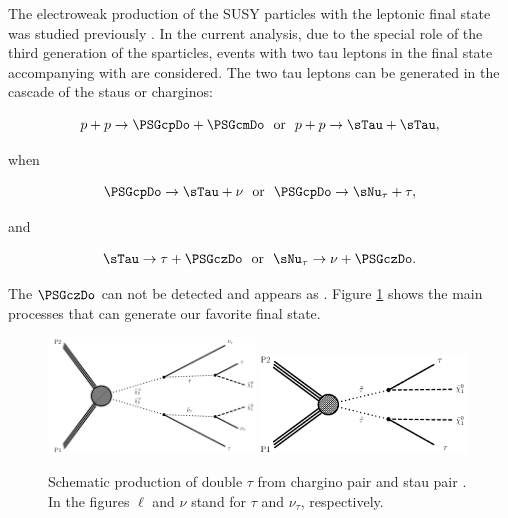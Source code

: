 The electroweak production of the SUSY particles with the leptonic final state was studied previously \cite{Khachatryan:2014qwa}.
In the current analysis, due to the special role of the third generation of the sparticles, events with two tau leptons in the final state 
accompanying with \MPT are considered.
The two tau leptons can be generated in the cascade of the staus or charginos:
\begin{linenomath}
\begin{equation}
p + p \rightarrow \PSGcpDo +\PSGcmDo ~~\mathrm{or}~~  p + p \rightarrow \sTau + \sTau,
\end{equation}
\end{linenomath}
when 
\begin{linenomath}
\begin{equation}
\PSGcpDo \rightarrow \sTau + \nu ~~\mathrm{or}~~  \PSGcpDo \rightarrow \sNu_{\tau} + \tau,
\end{equation}
\end{linenomath}
and 
\begin{linenomath}
\begin{equation}
\sTau \rightarrow \tau + \PSGczDo ~~\mathrm{or}~~  \sNu_{\tau} \rightarrow \nu + \PSGczDo.
\end{equation}
\end{linenomath}
The $\PSGczDo$ can not be detected and appears as \MPT.
Figure \ref{fig:Productions} shows the main processes that can generate our favorite final state.
\begin{figure}[!Hhtb]
\centering
\includegraphics[width=0.49\textwidth]{Introductionfigs/TChipmSlepSnu.pdf}
\includegraphics[width=0.49\textwidth]{Introductionfigs/TSlepSlep.pdf}
\caption{Schematic production of double $\tau$ from chargino pair and stau pair \cite{Khachatryan:2014qwa}. 
  In the figures $\ell$ and $\nu$ stand for $\tau$ and $\nu_{\tau}$, respectively.}
\label{fig:Productions}
\end{figure}
